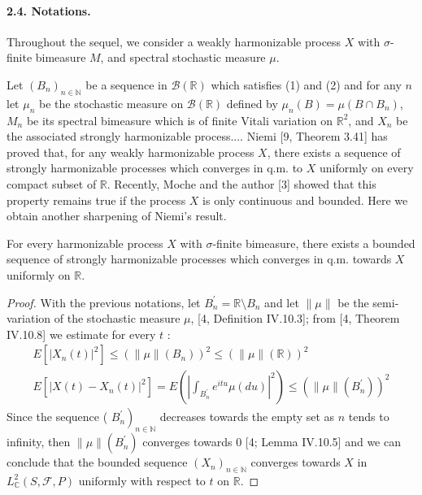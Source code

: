 \documentclass{article}
\begin{document}
\paragraph{2.4. Notations.} %
Throughout the sequel, we consider a weakly harmonizable process \(X\) with \(\sigma\)-finite bimeasure \(M\), and spectral stochastic measure \(\mu\).

Let \(\left(B_{n}\right)_{n \in \mathbb{N}}\) be a sequence in \(\mathscr{B}(\mathbb{R})\) which satisfies (1) and (2) and for any \(n\) let \(\mu_{n}\) be the stochastic measure on \(\mathscr{B}(\mathbb{R})\) defined by \(\mu_{n}(B)=\mu\left(B \cap B_{n}\right)\), \(M_{n}\) be its spectral bimeasure which is of finite Vitali variation on \(\mathbb{R}^{2}\), and \(X_{n}\) be the associated strongly harmonizable process.... Niemi [9, Theorem 3.41] has proved that, for any weakly harmonizable process \(X\), there exists a sequence of strongly harmonizable processes which converges in q.m. to \(X\) uniformly on every compact subset of \(\mathbb{R}\). Recently, Moche and the author [3] showed that this property remains true if the process \(X\) is only continuous and bounded. Here we obtain another sharpening of Niemi's result.

\setcounter{proposition}{4} %
\begin{proposition} %
For every harmonizable process \(X\) with \(\sigma\)-finite bimeasure, there exists a bounded sequence of strongly harmonizable processes which converges in q.m. towards \(X\) uniformly on \(\mathbb{R}\).
\end{proposition}

\begin{proof}
With the previous notations, let \(B_{n}^{\prime}=\mathbb{R} \setminus B_{n}\) and let \(\|\mu\|\) be the semi-variation of the stochastic measure \(\mu\), [4, Definition IV.10.3]; from [4, Theorem IV.10.8] we estimate for every \(t\) :
\[
\begin{gathered}
E\left[\left|X_{n}(t)\right|^{2}\right] \leqslant\left(\|\mu\|\left(B_{n}\right)\right)^{2} \leqslant(\|\mu\|(\mathbb{R}))^{2} \\
E\left[\left|X(t)-X_{n}(t)\right|^{2}\right]=E\left(\left|\int_{B_{n}^{\prime}} e^{i t u} \mu(d u)\right|^{2}\right) \leqslant\left(\|\mu\|\left(B_{n}^{\prime}\right)\right)^{2}
\end{gathered}
\]
Since the sequence ( \(\left.B_{n}^{\prime}\right)_{n \in \mathbb{N}}\) decreases towards the empty set as \(n\) tends to infinity, then \(\|\mu\|\left(B_{n}^{\prime}\right)\) converges towards 0 [4; Lemma IV.10.5] and we can conclude that the bounded sequence \(\left(X_{n}\right)_{n \in \mathbb{N}}\) converges towards \(X\) in \(L_{\mathbb{C}}^{2}(S, \mathscr{F}, P)\) uniformly with respect to \(t\) on \(\mathbb{R}\).
\end{proof}
\end{document}
